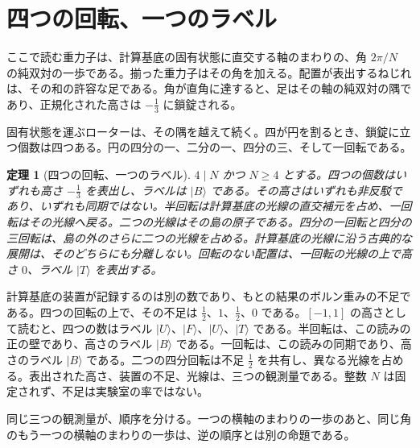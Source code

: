 \documentclass[a4paper]{article}
\newtheorem{theorem}{定理}[section]
\theoremstyle{definition}
\begin{document}
\section{四つの回転、一つのラベル}
\label{sec:turns}

ここで読む重力子は、計算基底の固有状態に直交する軸のまわりの、角 \(2\pi/N\) の純双対の一歩である。揃った重力子はその角を加える。配置が表出するねじれは、その和の許容な足である。角が直角に達すると、足はその軸の純双対の隅であり、正規化された高さは \(-\frac13\) に鎖錠される。

固有状態を運ぶローターは、その隅を越えて続く。四が円を割るとき、鎖錠に立つ個数は四つある。円の四分の一、二分の一、四分の三、そして一回転である。

\begin{theorem}[四つの回転、一つのラベル]
\label{thm:turns}
\(4\mid N\) かつ \(N\ge 4\) とする。四つの個数はいずれも高さ \(-\frac13\) を表出し、ラベルは \(\lvert B\rangle\) である。その高さはいずれも非反駁であり、いずれも同期ではない。半回転は計算基底の光線の直交補元を占め、一回転はその光線へ戻る。二つの光線はその島の原子である。四分の一回転と四分の三回転は、島の外のさらに二つの光線を占める。計算基底の光線に沿う古典的な展開は、そのどちらにも分離しない。回転のない配置は、一回転の光線の上で高さ \(0\)、ラベル \(\lvert T\rangle\) を表出する。
\end{theorem}

計算基底の装置が記録するのは別の数であり、もとの結果のボルン重みの不足である。四つの回転の上で、その不足は \(\frac12\)、\(1\)、\(\frac12\)、\(0\) である。\([-1,1]\) の高さとして読むと、四つの数はラベル \(\lvert U\rangle\)、\(\lvert F\rangle\)、\(\lvert U\rangle\)、\(\lvert T\rangle\) である。半回転は、この読みの正の壁であり、高さのラベル \(\lvert B\rangle\) である。一回転は、この読みの同期であり、高さのラベル \(\lvert B\rangle\) である。二つの四分回転は不足 \(\frac12\) を共有し、異なる光線を占める。表出された高さ、装置の不足、光線は、三つの観測量である。整数 \(N\) は固定されず、不足は実験室の率ではない。

同じ三つの観測量が、順序を分ける。一つの横軸のまわりの一歩のあと、同じ角のもう一つの横軸のまわりの一歩は、逆の順序とは別の命題である。
\end{document}
